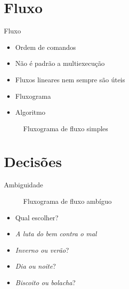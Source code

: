 \documentclass[14pt]{beamer}
\subtitle{E se\dots}
\begin{document}
	\begin{frame}
		\titlepage
	\end{frame}

	\begin{frame}
		\tableofcontents
	\end{frame}

	\section{Fluxo}
		\begin{frame}{Fluxo}
			\begin{itemize}
				\presentationPause\item Ordem de comandos
				\presentationPause\item Não é padrão a multiexecução
				\presentationPause\item Fluxos lineares nem sempre são úteis
				\presentationPause\item Fluxograma
				\presentationPause\item Algoritmo
			\end{itemize}
			\presentationPause
			\begin{figure}
				\centering
				
				\caption{Fluxograma de fluxo simples}
				\label{fig.flow.simple}
			\end{figure}
		\end{frame}

	\section{Decisões}
		\begin{frame}{Ambiguidade}
			\presentationPause
			\begin{figure}
				\centering
				
				\caption{Fluxograma de fluxo ambíguo}
				\label{fig.flow.double}
			\end{figure}
			\begin{itemize}
				\presentationPause\item Qual escolher?
				\presentationPause\item \emph{A luta do bem contra o mal}
				\presentationPause\item \emph{Inverno ou verão}?
				\presentationPause\item \emph{Dia ou noite}?
				\presentationPause\item \emph{Biscoito ou bolacha}?
			\end{itemize}
		\end{frame}
\end{document}
